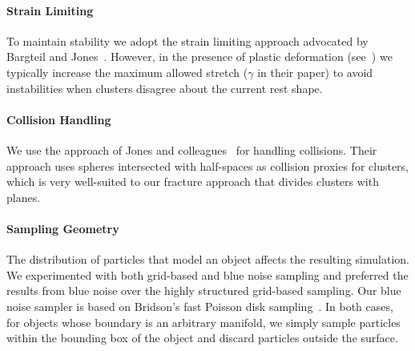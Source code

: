 \documentclass[conference]{acmsiggraph}
\begin{document}

\paragraph{Strain Limiting}
To maintain stability we adopt the strain limiting approach advocated by Bargteil and Jones~.
However, in the presence of plastic deformation (see~) we typically increase the maximum allowed stretch ($\gamma$ in
their paper) to avoid instabilities when clusters disagree about the current rest shape.

\paragraph{Collision Handling}
We use the approach of Jones and colleagues~ for handling collisions.  Their approach
uses spheres intersected with half-spaces as collision proxies for clusters, which is very well-suited to our
fracture approach that divides clusters with planes.

\paragraph{Sampling Geometry}
The distribution of particles that model an object 
affects the resulting simulation.  We
experimented with both grid-based and blue noise sampling and
preferred the results from blue noise over the highly structured grid-based sampling.
Our blue noise sampler is based on Bridson's fast Poisson disk
sampling~\cite{Bridson:2007:FPD}.  In both cases, for objects whose
boundary is an arbitrary manifold, we simply sample particles within
the bounding box of the object and discard particles outside
the surface.
\end{document}
